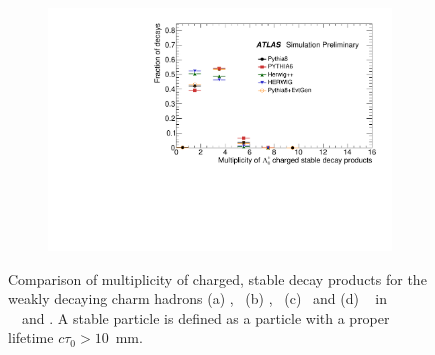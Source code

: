 \begin{figure}
\begin{subfigure}[]{0.45\textwidth}
\end{subfigure}
\begin{subfigure}[]{0.45\textwidth}
\includegraphics[width=\textwidth]{evtgen/figures/EvtGen/Lambdac+/h_species_ncharge.pdf}
\end{subfigure}
\caption{Comparison of multiplicity of charged, stable decay products for the weakly decaying 
charm hadrons 
(a) \Dzero,~ (b) \Dplus,~ (c) \Ds\ and (d) \Lc~
in \PythiaE\,~ \Pythia\, \newline  \Herwigpp\, ~\Herwig\ and \EvtGen.  A stable particle is defined
as a particle with a proper lifetime $c\tau_{0}>10$~mm. } 
\label{fig:ccharge}
\end{figure}

